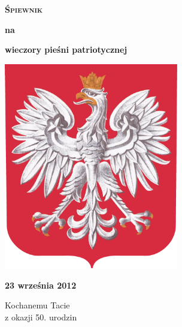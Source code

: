 \documentclass[a4paper,twoside,noinfo,frontmatter]{songbook}
\begin{document}
\begin{front}
\begin{titlepage}
\begin{center}
  {\VERYHUGE \bfseries\textsc{Śpiewnik}}

  \vspace{0.2in}
  {\Huge\bfseries na}
  \vspace{0.2in}
  
  {\HUGE\bfseries wieczory pieśni patriotycznej}
\end{center}
\vspace{0.5in}
\begin{center}
  \includegraphics[width=3in]{img/godlo-small.png}
\end{center}
\vspace{0.55in}
\begin{center}
  {\Huge\bfseries 23 września 2012}
\end{center}
\end{titlepage}

\begin{dedication}
  Kochanemu Tacie\\
  z okazji 50. urodzin
\end{dedication}
\end{front}



\end{document}
